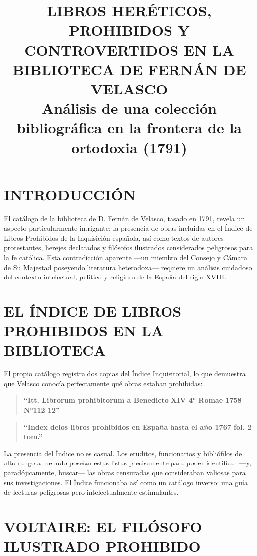 \documentclass[12pt,a4paper]{article}
\title{\textbf{LIBROS HERÉTICOS, PROHIBIDOS Y CONTROVERTIDOS EN LA BIBLIOTECA DE FERNÁN DE VELASCO} \\ 
\large Análisis de una colección bibliográfica en la frontera de la ortodoxia (1791)}
\author{}
\date{}
\begin{document}
\maketitle

\section*{INTRODUCCIÓN}

El catálogo de la biblioteca de D. Fernán de Velasco, tasado en 1791, revela un aspecto particularmente intrigante: la presencia de obras incluidas en el Índice de Libros Prohibidos de la Inquisición española, así como textos de autores protestantes, herejes declarados y filósofos ilustrados considerados peligrosos para la fe católica. Esta contradicción aparente ---un miembro del Consejo y Cámara de Su Majestad poseyendo literatura heterodoxa--- requiere un análisis cuidadoso del contexto intelectual, político y religioso de la España del siglo XVIII.

\section{EL ÍNDICE DE LIBROS PROHIBIDOS EN LA BIBLIOTECA}

El propio catálogo registra dos copias del Índice Inquisitorial, lo que demuestra que Velasco conocía perfectamente qué obras estaban prohibidas:

\begin{quote}
\textbf{``Itt. Librorum prohibitorum a Benedicto XIV 4° Romae 1758 N°112 12''}
\end{quote}

\begin{quote}
\textbf{``Index delos libros prohibidos en España hasta el año 1767 fol. 2 tom.''}
\end{quote}

La presencia del Índice no es casual. Los eruditos, funcionarios y bibliófilos de alto rango a menudo poseían estas listas precisamente para poder identificar ---y, paradójicamente, buscar--- las obras censuradas que consideraban valiosas para sus investigaciones. El Índice funcionaba así como un catálogo inverso: una guía de lecturas peligrosas pero intelectualmente estimulantes.

\section{VOLTAIRE: EL FILÓSOFO ILUSTRADO PROHIBIDO}
\end{document}
